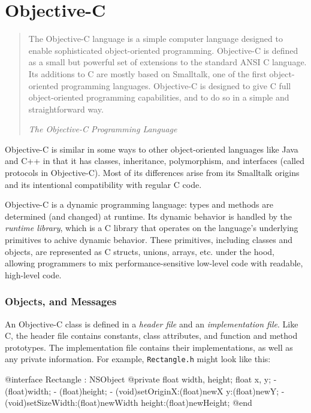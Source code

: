 \section{Objective-C}
\label{sect:objc}

\begin{quote}

    The Objective-C language is a simple computer language designed to enable
    sophisticated object-oriented programming. Objective-C is defined as a small
    but powerful set of extensions to the standard ANSI C language. Its
    additions to C are mostly based on Smalltalk, one of the first
    object-oriented programming languages. Objective-C is designed to give C
    full object-oriented programming capabilities, and to do so in a simple and
    straightforward way.

    \raggedleft \em The Objective-C Programming Language \cite{objc:manual}

\end{quote}

Objective-C is similar in some ways to other object-oriented languages like Java
and C++ in that it has classes, inheritance, polymorphism, and interfaces
(called protocols in Objective-C). Most of its differences arise from its
Smalltalk origins and its intentional compatibility with regular C code.

Objective-C is a dynamic programming language: types and methods are determined
(and changed) at runtime. Its dynamic behavior is handled by the \emph{runtime
library}, which is a C library that operates on the language's underlying
primitives to achive dynamic behavior. These primitives, including classes and
objects, are represented as C structs, unions, arrays, etc. under the hood,
allowing programmers to mix performance-sensitive low-level code with readable,
high-level code.

\subsubsection{Objects, and Messages}
\label{sect:objc_objects}

An Objective-C class is defined in a \emph{header file} and an
\emph{implementation file}. Like C, the header file contains constants, class
attributes, and function and method prototypes. The implementation file contains
their implementations, as well as any private information. For example,
\texttt{Rectangle.h} might look like this:

\begin{objc}
@interface Rectangle : NSObject {
    @private
    float width, height;
    float x, y;
}
- (float)width;
- (float)height;
- (void)setOriginX:(float)newX y:(float)newY;
- (void)setSizeWidth:(float)newWidth height:(float)newHeight;
@end
\end{objc}

